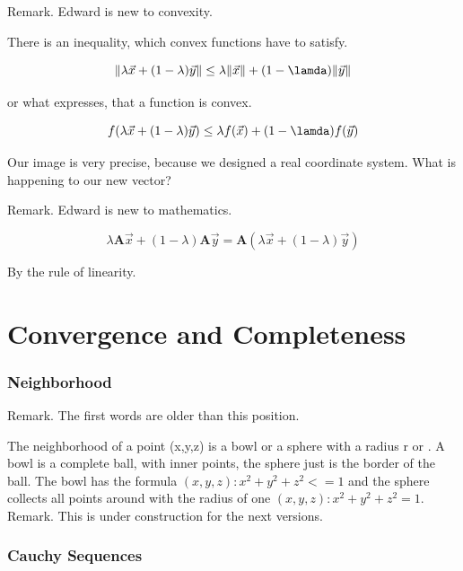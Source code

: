 \documentclass[a4paper]{article}
\begin{document}
Remark. Edward is new to convexity.

There is an inequality, which convex functions have to satisfy.

\begin{displaymath}
\|\lambda\vec{x} + (1-\lambda)\vec{y}\| \leq \lambda\|\vec{x}\| + (1-\lamda)\|\vec{y}\|
\end{displaymath}

or what expresses, that a function is convex.

\begin{displaymath}
f(\lambda\vec{x} + (1-\lambda)\vec{y}) \leq \lambda f(\vec{x}) + (1-\lamda)f(\vec{y})
\end{displaymath}

Our image is very precise, because we designed a real coordinate system. What is happening to our new vector? 

Remark. Edward is new to mathematics.

\begin{displaymath}
\lambda\boldsymbol{A}\vec{x} + (1-\lambda)\boldsymbol{A}\vec{y} = \boldsymbol{A}(\lambda\vec{x} + (1-\lambda)\vec{y})
\end{displaymath}

By the rule of linearity.


\section{Convergence and Completeness}

\subsubsection{Neighborhood}

Remark. The first words are older than this position.

The neighborhood of a point (x,y,z) is a bowl or a sphere with a radius r or \epsilon. A bowl is a complete ball, with inner points, the sphere just is the border of the ball. The bowl has the formula ${ (x,y,z) : x^{2} + y^{2} + z^{2} <= 1 }$ and the sphere collects all points around with the radius of one ${ (x,y,z) : x^{2} + y^{2} + z^{2} = 1 }$.\\

Remark. This is under construction for the next versions.


\subsubsection{Cauchy Sequences}
\end{document}
